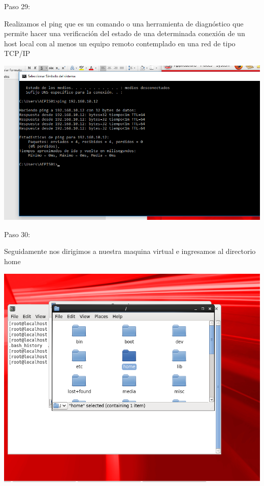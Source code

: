 \begin{itemize}
\begin{center}
    Paso 29:
\end{center}

    Realizamos el ping que es un comando o una herramienta de diagnóstico que permite hacer una verificación del estado de una determinada conexión de un host local con al menos un equipo remoto contemplado en una red de tipo TCP/IP \\
	\begin{center}
	\includegraphics[width=15cm]{./Imagenes/imagen29} 
	\end{center}

\end{itemize} 

\begin{itemize}
\begin{center}
    Paso 30:
\end{center}

    Seguidamente nos dirigimos a nuestra maquina virtual e ingresamos al directorio home \\
	\begin{center}
	\includegraphics[width=15cm]{./Imagenes/imagen30} 
	\end{center}

\end{itemize} 

